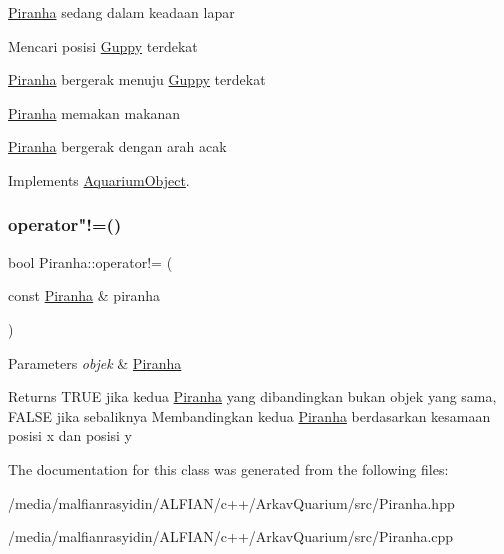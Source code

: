 \mbox{\hyperlink{class_piranha}{Piranha}} sedang dalam keadaan lapar

Mencari posisi \mbox{\hyperlink{class_guppy}{Guppy}} terdekat

\mbox{\hyperlink{class_piranha}{Piranha}} bergerak menuju \mbox{\hyperlink{class_guppy}{Guppy}} terdekat

\mbox{\hyperlink{class_piranha}{Piranha}} memakan makanan

\mbox{\hyperlink{class_piranha}{Piranha}} bergerak dengan arah acak 

Implements \mbox{\hyperlink{class_aquarium_object_a42c4de640f89ac8aebc26b7618578575}{Aquarium\+Object}}.

\mbox{\label{class_piranha_a672dc6e23eac17cda9f93737fabce742}} 
\subsubsection{\texorpdfstring{operator"!=()}{operator!=()}}
{\footnotesize\ttfamily bool Piranha\+::operator!= (\begin{DoxyParamCaption}\item[{const \mbox{\hyperlink{class_piranha}{Piranha}} \&}]{piranha }\end{DoxyParamCaption})}


\begin{DoxyParams}{Parameters}
{\em objek} & \mbox{\hyperlink{class_piranha}{Piranha}} \\
\hline
\end{DoxyParams}
\begin{DoxyReturn}{Returns}
T\+R\+UE jika kedua \mbox{\hyperlink{class_piranha}{Piranha}} yang dibandingkan bukan objek yang sama, F\+A\+L\+SE jika sebaliknya Membandingkan kedua \mbox{\hyperlink{class_piranha}{Piranha}} berdasarkan kesamaan posisi x dan posisi y 
\end{DoxyReturn}


The documentation for this class was generated from the following files\+:\begin{DoxyCompactItemize}
\item 
/media/malfianrasyidin/\+A\+L\+F\+I\+A\+N/c++/\+Arkav\+Quarium/src/Piranha.\+hpp\item 
/media/malfianrasyidin/\+A\+L\+F\+I\+A\+N/c++/\+Arkav\+Quarium/src/Piranha.\+cpp\end{DoxyCompactItemize}
